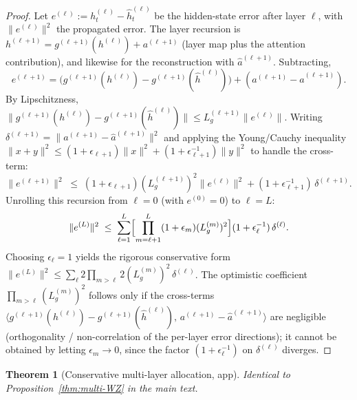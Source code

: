 \documentclass[11pt]{article}
\theoremstyle{plain}
\newtheorem{theorem}{Theorem}[section]
\theoremstyle{definition}
\theoremstyle{remark}
\begin{document}
\begin{proof}
Let $e^{(\ell)} := h_t^{(\ell)} - \hat h_t^{(\ell)}$ be the
hidden-state error after layer $\ell$, with
$\|e^{(\ell)}\|^2$ the propagated error. The layer recursion is
$h^{(\ell+1)} = g^{(\ell+1)}(h^{(\ell)}) + a^{(\ell+1)}$ (layer map
plus the attention contribution), and likewise for the
reconstruction with $\hat a^{(\ell+1)}$. Subtracting,
\[
e^{(\ell+1)}
= \bigl(g^{(\ell+1)}(h^{(\ell)}) - g^{(\ell+1)}(\hat h^{(\ell)})\bigr)
  + (a^{(\ell+1)} - \hat a^{(\ell+1)}).
\]
By Lipschitzness, $\|g^{(\ell+1)}(h^{(\ell)}) -
g^{(\ell+1)}(\hat h^{(\ell)})\| \leq L_g^{(\ell+1)}\|e^{(\ell)}\|$.
Writing $\delta^{(\ell+1)} = \|a^{(\ell+1)} - \hat a^{(\ell+1)}\|^2$
and applying the Young/Cauchy inequality
$\|x + y\|^2 \leq (1+\epsilon_{\ell+1})\|x\|^2 +
(1+\epsilon_{\ell+1}^{-1})\|y\|^2$ to handle the cross-term:
\[
\|e^{(\ell+1)}\|^2
\;\leq\;
(1+\epsilon_{\ell+1})(L_g^{(\ell+1)})^2 \|e^{(\ell)}\|^2
+ (1 + \epsilon_{\ell+1}^{-1})\, \delta^{(\ell+1)}.
\]
Unrolling this recursion from $\ell = 0$ (with $e^{(0)} = 0$) to
$\ell = L$:
\[
\|e^{(L)}\|^2
\;\leq\;
\sum_{\ell=1}^L
  \Bigl[\prod_{m=\ell+1}^L (1+\epsilon_m)(L_g^{(m)})^2\Bigr]
  (1+\epsilon_\ell^{-1})\,\delta^{(\ell)}.
\]
Choosing $\epsilon_\ell = 1$ yields the rigorous conservative form
$\|e^{(L)}\|^2 \le \sum_\ell 2\prod_{m>\ell}2(L_g^{(m)})^2\,\delta^{(\ell)}$.
The optimistic coefficient $\prod_{m>\ell}(L_g^{(m)})^2$ follows only
if the cross-terms
$\langle g^{(\ell+1)}(h^{(\ell)})-g^{(\ell+1)}(\hat h^{(\ell)}),\,
a^{(\ell+1)}-\hat a^{(\ell+1)}\rangle$ are negligible
(orthogonality / non-correlation of the per-layer error directions);
it cannot be obtained by letting $\epsilon_m\to0$, since the factor
$(1+\epsilon_\ell^{-1})$ on $\delta^{(\ell)}$ diverges.
\end{proof}

\begin{theorem}[Conservative multi-layer allocation, app]\label{thm:multi-WZ-app}
Identical to Proposition~\ref{thm:multi-WZ} in the main text.
\end{theorem}
\end{document}
